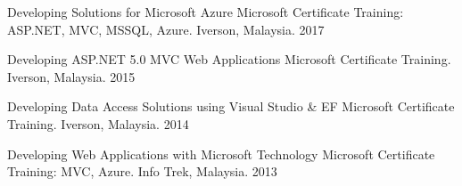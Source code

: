 
\begin{cvhonors}

    \cvhonor
    {Developing Solutions for Microsoft Azure} %
    {Microsoft Certificate Training: ASP.NET, MVC, MSSQL, Azure.} %
    {Iverson, Malaysia.} %
    {2017} %

    \cvhonor
    {Developing ASP.NET 5.0 MVC Web Applications} %
    {Microsoft Certificate Training.} %
    {Iverson, Malaysia.} %
    {2015} %

    \cvhonor
    {Developing Data Access Solutions using Visual Studio \& EF} %
    {Microsoft Certificate Training.} %
    {Iverson, Malaysia.} %
    {2014} %

    \cvhonor
    {Developing Web Applications with Microsoft Technology} %
    {Microsoft Certificate Training: MVC, Azure.} %
    {Info Trek, Malaysia.} %
    {2013} %

\end{cvhonors}